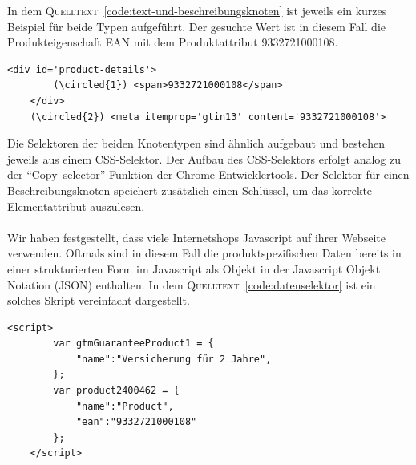 In dem \textsc{Quelltext}~\ref{code:text-und-beschreibungsknoten} ist jeweils ein kurzes Beispiel für beide Typen aufgeführt.
Der gesuchte Wert ist in diesem Fall die Produkteigenschaft EAN mit dem Produktattribut 9332721000108.
\vspace{0.25cm}
\begin{lstlisting}[label={code:text-und-beschreibungsknoten}]
    <div id='product-details'>
        (\circled{1}) <span>9332721000108</span>
    </div>
    (\circled{2}) <meta itemprop='gtin13' content='9332721000108'>
\end{lstlisting}
\vspace{-0.25cm}
\vspace{0.25cm}
Die Selektoren der beiden Knotentypen sind ähnlich aufgebaut und bestehen jeweils aus einem CSS-Selektor.
Der Aufbau des CSS-Selektors erfolgt analog zu der ``Copy~selector''-Funktion der Chrome-Entwicklertools.
Der Selektor für einen Beschreibungsknoten speichert zusätzlich einen Schlüssel, um das korrekte Elementattribut
auszulesen.
\\
~\\
Wir haben festgestellt, dass viele Internetshops Javascript auf ihrer Webseite verwenden.
Oftmals sind in diesem Fall die produktspezifischen Daten bereits in einer strukturierten Form im Javascript
als Objekt in der Javascript Objekt Notation (JSON) enthalten.
In dem \textsc{Quelltext}~\ref{code:datenselektor} ist ein solches Skript vereinfacht dargestellt.
\vspace{0.25cm}
\begin{lstlisting}[label={code:datenselektor}]
    <script>
        var gtmGuaranteeProduct1 = {
            "name":"Versicherung für 2 Jahre",
        };
        var product2400462 = {
            "name":"Product",
            "ean":"9332721000108"
        };
    </script>
\end{lstlisting}
\vspace{-0.25cm}
\vspace{0.25cm}

